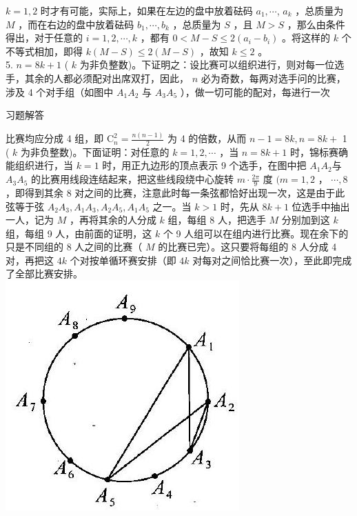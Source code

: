 \documentclass[10pt]{article}
\begin{document}
$k=1,2$ 时才有可能，实际上，如果在左边的盘中放着砝码 $a_{1}, \cdots$, $a_{k}$ ，总质量为 $M$ ，而在右边的盘中放着砝码 $b_{1}, \cdots, b_{k}$ ，总质量为 $S$ ，且 $M>S$ ，那么由条件得出，对于任意的 $i=1,2, \cdots, k$ ，都有 $0<M-S \leqslant 2\left(a_{i}-b_{i}\right)$ 。将这样的 $k$ 个不等式相加，即得 $k(M-S) \leqslant 2(M-S)$ ，故知 $k \leqslant 2$ 。\\
5. $n=8 k+1$ ( $k$ 为非负整数)。下证明之：设比赛可以组织进行，则对每一位选手，其余的人都必须配对出席双打，因此， $n$ 必为奇数，每两对选手问的比赛，涉及 4 个对手组（如图中 $A_{1} A_{2}$ 与 $A_{3} A_{5}$ ），做一切可能的配对，每进行一次

习题解答

比赛均应分成 4 组，即 $\mathrm{C}_{n}^{2}=\frac{n(n-1)}{2}$ 为 4 的倍数，从而 $n-1=8 k, n=8 k+$ 1 ( $k$ 为非负整数)。下面证明：对任意的 $k=1,2, \cdots$ ，当 $n=8 k+1$ 时，锦标赛确能组织进行，当 $k=1$ 时，用正九边形的顶点表示 9 个选手，在图中把 $A_{1} A_{2}$与 $A_{3} A_{5}$ 的比赛用线段连结起来，把这些线段绕中心旋转 $m \cdot \frac{2 \pi}{9}$ 度 $(m=1,2$ ， $\cdots, 8$ ，即得到其余 8 对之间的比赛，注意此时每一条弦都恰好出现一次，这是由于此弦等于弦 $A_{2} A_{3}, A_{1} A_{3}, A_{2} A_{5}, A_{1} A_{5}$ 之一。当 $k>1$ 时，先从 $8 k+1$ 位选手中抽出一人，记为 $M$ ，再将其余的人分成 $k$ 组，每组 8 人，把选手 $M$ 分别加到这 $k$ 组，每组 9 人，由前面的证明，这 $k$ 个 9 人组可以在组内进行比赛。现在余下的只是不同组的 8 人之间的比赛（ $M$ 的比赛已完）。这只要将每组的 8 人分成 4 对，再把这 $4 k$ 个对按单循环赛安排（即 $4 k$ 对每对之间恰比赛一次），至此即完成了全部比赛安排。\\
\includegraphics[max width=\textwidth, center]{2024_10_30_21385cc68d0979b6f3f8g-180}\\
\end{document}
